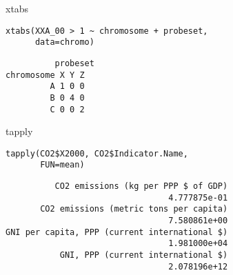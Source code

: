 \documentclass[xcolor={usenames,svgnames,dvipsnames}]{beamer}
\begin{document}
\begin{frame}[fragile,label=sec-3-3]{xtabs}
 \lstset{language=R,numbers=none}
\begin{lstlisting}
xtabs(XXA_00 > 1 ~ chromosome + probeset,
      data=chromo)
\end{lstlisting}

\begin{verbatim}
          probeset
chromosome X Y Z
         A 1 0 0
         B 0 4 0
         C 0 0 2
\end{verbatim}
\end{frame}
\begin{frame}[fragile,label=sec-3-4]{tapply}
 \lstset{language=R,numbers=none}
\begin{lstlisting}
tapply(CO2$X2000, CO2$Indicator.Name,
       FUN=mean)
\end{lstlisting}

\begin{verbatim}
          CO2 emissions (kg per PPP $ of GDP) 
                                 4.777875e-01 
       CO2 emissions (metric tons per capita) 
                                 7.580861e+00 
GNI per capita, PPP (current international $) 
                                 1.981000e+04 
           GNI, PPP (current international $) 
                                 2.078196e+12
\end{verbatim}
\end{frame}
\end{document}
